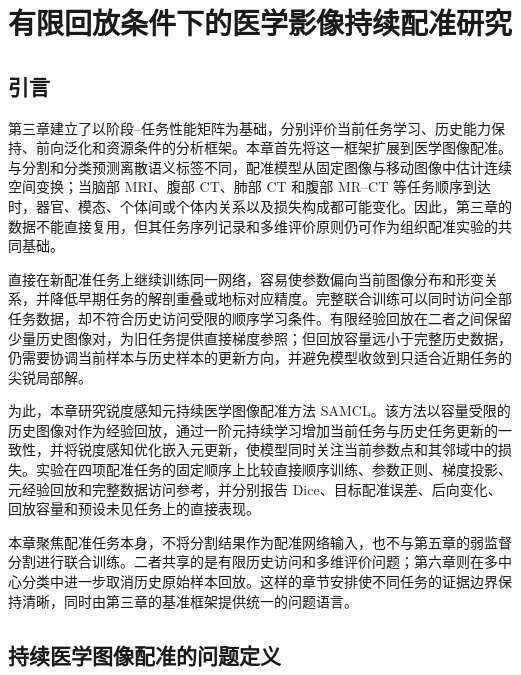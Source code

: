 \chapter{有限回放条件下的医学影像持续配准研究}
\label{chap:registration}
\setlength{\emergencystretch}{1em}

\section{引言}
\label{sec:registration-introduction}

第三章建立了以阶段--任务性能矩阵为基础，分别评价当前任务学习、历史能力保持、前向泛化和资源条件的分析框架。本章首先将这一框架扩展到医学图像配准。与分割和分类预测离散语义标签不同，配准模型从固定图像与移动图像中估计连续空间变换；当脑部 MRI、腹部 CT、肺部 CT 和腹部 MR--CT 等任务顺序到达时，器官、模态、个体间或个体内关系以及损失构成都可能变化。因此，第三章的数据不能直接复用，但其任务序列记录和多维评价原则仍可作为组织配准实验的共同基础。

直接在新配准任务上继续训练同一网络，容易使参数偏向当前图像分布和形变关系，并降低早期任务的解剖重叠或地标对应精度。完整联合训练可以同时访问全部任务数据，却不符合历史访问受限的顺序学习条件。有限经验回放在二者之间保留少量历史图像对，为旧任务提供直接梯度参照；但回放容量远小于完整历史数据，仍需要协调当前样本与历史样本的更新方向，并避免模型收敛到只适合近期任务的尖锐局部解。

为此，本章研究锐度感知元持续医学图像配准方法 SAMCL\cite{wang2024samcl}。该方法以容量受限的历史图像对作为经验回放，通过一阶元持续学习增加当前任务与历史任务更新的一致性，并将锐度感知优化嵌入元更新，使模型同时关注当前参数点和其邻域中的损失。实验在四项配准任务的固定顺序上比较直接顺序训练、参数正则、梯度投影、元经验回放和完整数据访问参考，并分别报告 Dice、目标配准误差、后向变化、回放容量和预设未见任务上的直接表现。

本章聚焦配准任务本身，不将分割结果作为配准网络输入，也不与第五章的弱监督分割进行联合训练。二者共享的是有限历史访问和多维评价问题；第六章则在多中心分类中进一步取消历史原始样本回放。这样的章节安排使不同任务的证据边界保持清晰，同时由第三章的基准框架提供统一的问题语言。

\section{持续医学图像配准的问题定义}
\label{sec:registration-formulation}

